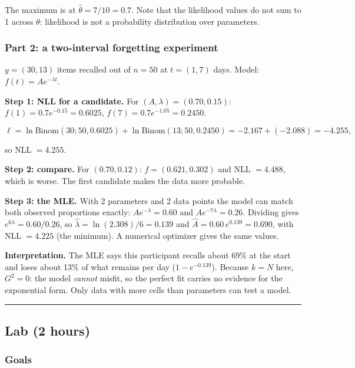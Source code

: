 The maximum is at \(\hat\theta = 7/10 = 0.7\). Note that the likelihood
values do not sum to 1 across \(\theta\): likelihood is not a
probability distribution over parameters.

\subsubsection{Part 2: a two-interval forgetting experiment}

\(y = (30, 13)\) items recalled out of \(n = 50\) at \(t = (1, 7)\)
days. Model: \(f(t) = A e^{-\lambda t}\).

\textbf{Step 1: NLL for a candidate.} For
\((A, \lambda) = (0.70, 0.15)\): \(f(1) = 0.7e^{-0.15} = 0.6025\),
\(f(7) = 0.7e^{-1.05} = 0.2450\).

\[
\ell = \ln\mathrm{Binom}(30; 50, 0.6025) + \ln\mathrm{Binom}(13; 50, 0.2450) = -2.167 + (-2.088) = -4.255,
\]

so NLL \(= 4.255\).

\textbf{Step 2: compare.} For \((0.70, 0.12)\): \(f = (0.621, 0.302)\)
and NLL \(= 4.488\), which is worse. The first candidate makes the data
more probable.

\textbf{Step 3: the MLE.} With 2 parameters and 2 data points the model
can match both observed proportions exactly: \(A e^{-\lambda} = 0.60\)
and \(A e^{-7\lambda} = 0.26\). Dividing gives
\(e^{6\lambda} = 0.60/0.26\), so \(\hat\lambda = \ln(2.308)/6 = 0.139\)
and \(\hat A = 0.60\,e^{0.139} = 0.690\), with NLL \(= 4.225\) (the
minimum). A numerical optimizer gives the same values.

\textbf{Interpretation.} The MLE says this participant recalls about
69\% at the start and loses about 13\% of what remains per day
(\(1 - e^{-0.139}\)). Because \(k = N\) here, \(G^2 = 0\): the model
\emph{cannot} misfit, so the perfect fit carries no evidence for the
exponential form. Only data with more cells than parameters can test a
model.

\begin{center}\rule{0.5\linewidth}{0.5pt}\end{center}


\subsection{Lab (2 hours)}

\subsubsection{Goals}

